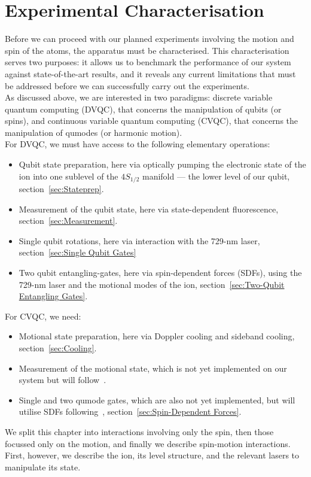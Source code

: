 \chapter{Experimental Characterisation}
\label{ch:Characterisation}
\minitoc

    Before we can proceed with our planned experiments involving the motion and
    spin of the atoms, the apparatus must be characterised. This characterisation
    serves two purposes: it allows us to benchmark the performance of our system
    against state-of-the-art results, and it reveals any current limitations
    that must be addressed before we can successfully carry out the experiments.\\
    As discussed above, we are interested in two paradigms: discrete variable quantum computing (DVQC), that concerns the manipulation of qubits (or spins), and continuous variable quantum computing (CVQC), that concerns the manipulation of qumodes (or harmonic motion).\\
    For DVQC, we must have access to the following elementary operations:
    \begin{itemize}
        \item Qubit state preparation, here via optically pumping the electronic state of the ion into one sublevel of the $4S_{1/2}$ manifold --- the lower level of our qubit, section~\ref{sec:Stateprep}.
        \item Measurement of the qubit state, here via state-dependent fluorescence, section~\ref{sec:Measurement}.
        \item Single qubit rotations, here via interaction with the 729-nm laser, section~\ref{sec:Single Qubit Gates}
        \item Two qubit entangling-gates, here via spin-dependent forces (SDFs), using the 729-nm laser and the motional modes of the ion, section~\ref{sec:Two-Qubit Entangling Gates}.
    \end{itemize}
     For CVQC, we need:
    \begin{itemize}
        \item Motional state preparation, here via Doppler cooling and sideband cooling, section~\ref{sec:Cooling}.
        \item Measurement of the motional state, which is not yet implemented on our system but will follow~\cite{fluhmann2020direct}.
        \item Single and two qumode gates, which are also not yet implemented, but will utilise SDFs following~\cite{sutherland2021universal}, section~\ref{sec:Spin-Dependent Forces}.
    \end{itemize}
    We split this chapter into interactions involving only the spin, then those focussed only on the motion, and finally we describe spin-motion interactions.
    First, however, we describe the ion, its level structure, and the relevant lasers to manipulate its state.


